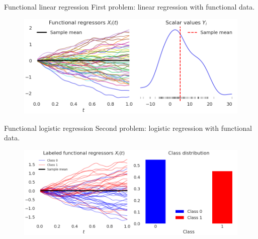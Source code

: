 \documentclass[9pt, english, professionalfonts]{beamer}
\newcommand\maroon[1]{\color{mLightBrown}#1\color{mDarkTeal}}
\begin{document}
\begin{frame}{Functional linear regression}
  \maroon{First problem}: linear regression with functional data.
  \vspace{2em}

\begin{figure}
    \includegraphics[width=\textwidth]{data_lin}
  \end{figure}
\end{frame}

\begin{frame}{Functional logistic regression}
  \maroon{Second problem}: logistic regression with functional data.
\vspace{2em}

\begin{figure}
    \includegraphics[width=\textwidth]{data_log}
  \end{figure}
\end{frame}
\end{document}
